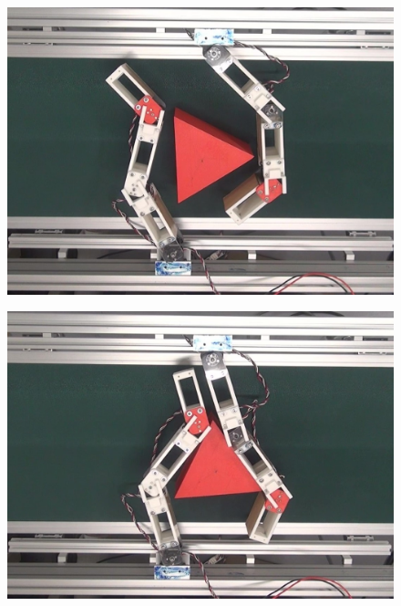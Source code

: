 \documentclass[a4paper,twoside,12pt,papersize, dvipdfmx]{iirthesis}
\begin{document}
\begin{figure}[hbt]
\centering
\begin{minipage}{0.249\hsize}
\centering
\includegraphics[width=0.98\hsize]{fig/4-manipulation-result/Triangle/1-1.jpg}
\subcaption{}\label{}
\end{minipage}\hfill
\begin{minipage}{0.249\hsize}
\centering
\includegraphics[width=0.98\hsize]{fig/4-manipulation-result/Triangle/1-2.jpg}
\subcaption{}\label{}
\end{minipage}\hfill
\begin{minipage}{0.249\hsize}
\centering

\end{minipage}
\end{figure}
\end{document}
